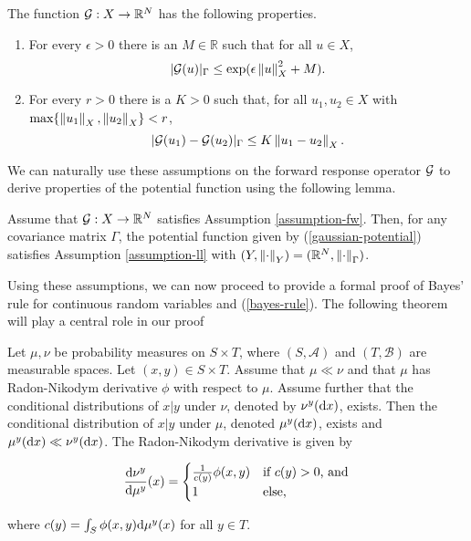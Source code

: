 \begin{assumption}\label{assumption-fw}
  The function $\mathcal{G} : X \rightarrow \mathbb{R}^N$ has the following properties.

  \begin{enumerate}
  \item For every $\epsilon > 0$ there is an $M \in \mathbb{R}$ such that for all $u \in X$,
    \begin{equation*}
      |\mathcal{G}(u)|_\Gamma \le \exp(\epsilon \left\lVert u\right\rVert_X^2 + M).
    \end{equation*}
  \item For every $r > 0$ there is a $K > 0$ such that, for all $u_1, u_2 \in X$ with $\text{max}\{\left\lVert u_1\right\rVert_X, \left\lVert u_2\right\rVert_X\} < r$,
    \begin{equation*}
      |\mathcal{G}(u_1) - \mathcal{G}(u_2)|_\Gamma \le K\left\lVert u_1 - u_2\right\rVert_X.
    \end{equation*}
  \end{enumerate}
\end{assumption}

We can naturally use these assumptions on the forward response operator $\mathcal{G}$ to derive properties of the potential function using the following lemma.

\begin{lemma} \label{fw-implies-ll}
  Assume that $\mathcal{G}  : X \rightarrow \mathbb{R}^N$ satisfies Assumption \ref{assumption-fw}. Then, for any covariance matrix $\Gamma$, the potential function given by (\ref{gaussian-potential}) satisfies Assumption \ref{assumption-ll} with $(Y, \left\lVert\cdot\right\rVert_Y) = (\mathbb{R}^N, \left\lVert\cdot\right\rVert_\Gamma)$.
\end{lemma}

Using these assumptions, we can now proceed to provide a formal proof of Bayes' rule for continuous random variables and (\ref{bayes-rule}). The following theorem will play a central role in our proof

\begin{theorem}
  \label{duley}
  Let $\mu, \nu$ be probability measures on $S \times T$, where $(S, \mathcal{A})$ and $(T, \mathcal{B})$ are measurable spaces. Let $(x, y) \in S \times T$. Assume that $\mu \ll \nu$ and that $\mu$ has Radon-Nikodym derivative $\phi$ with respect to $\mu$. Assume further that the conditional distributions of $x|y$ under $\nu$, denoted by $\nu^y(\text{d} x)$, exists. Then the conditional distribution of $x|y$ under $\mu$, denoted $\mu^y(\text{d} x)$, exists and $\mu^y(\text{d} x) \ll \nu^y(\text{d} x)$. The Radon-Nikodym derivative is given by

  \begin{equation}
    \frac{\text{d} \nu^y}{\text{d} \mu^y}(x) =  \begin{cases}
      \frac1{c(y)}\phi(x,y) & \text{if $c(y) > 0$, and}\\
      1 & \text{else,}
    \end{cases}  
  \end{equation}

  where $c(y) = \int_{S}\phi(x,y)\text{d} \mu^y(x)$ for all $y \in T$.
\end{theorem}

